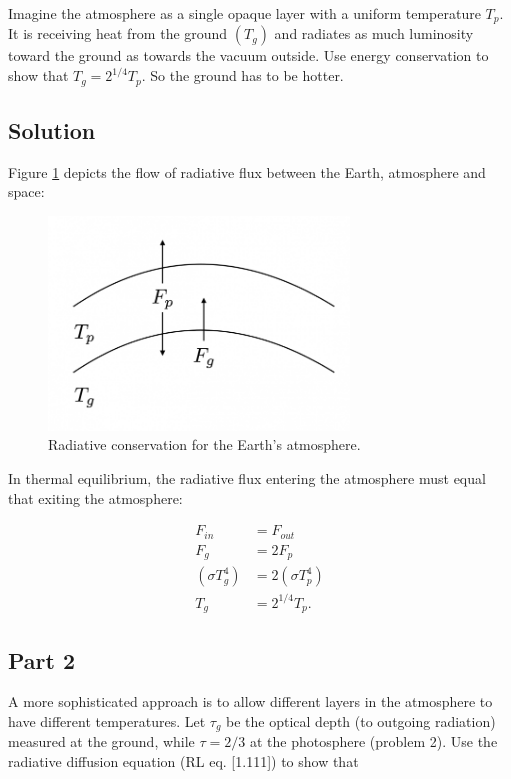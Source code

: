 \documentclass[12pt]{article}
\begin{document}
Imagine the atmosphere as a single opaque layer with a uniform temperature $T_p$. It is receiving heat from the ground $(T_g)$ and radiates as much luminosity toward the ground as towards the vacuum outside. Use energy conservation to show that $T_g = 2^{1/4}T_p$. So the ground has to be hotter.

\subsection*{Solution}

Figure \ref{fig:greenhouse} depicts the flow of radiative flux between the Earth, atmosphere and space:

\begin{figure}[h] \label{fig:greenhouse}
\includegraphics[width=8cm]{greenhouse.png}
\centering
\caption{Radiative conservation for the Earth's atmosphere.}
\end{figure}

In thermal equilibrium, the radiative flux entering the atmosphere must equal that exiting the atmosphere:

\begin{equation*}
\begin{split}
F_{in} &= F_{out}\\
F_g &= 2 F_p\\
(\sigma T_g^4) &= 2 (\sigma T_p^4)\\
T_g &= 2^{1/4}T_p.
\end{split}
\end{equation*}

\subsection*{Part 2}

A more sophisticated approach is to allow different layers in the atmosphere to have different temperatures. Let $\tau_g$ be the optical depth (to outgoing radiation) measured at the ground, while $\tau = 2/3$ at the photosphere (problem 2). Use the radiative diffusion equation (RL eq. [1.111]) to show that
\end{document}
